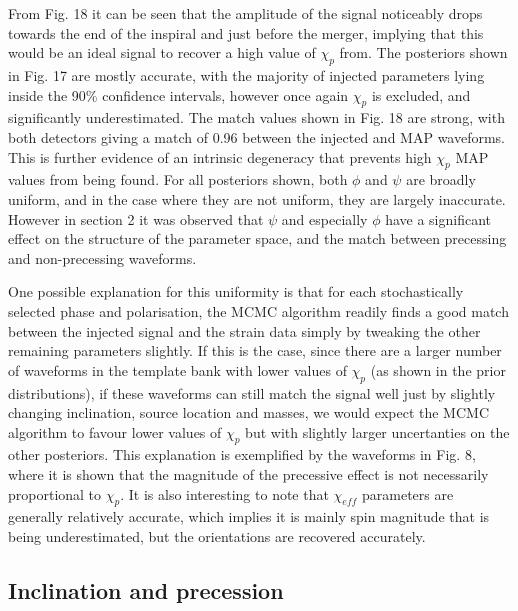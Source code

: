 \documentclass[11pt]{article}
\begin{document}
From Fig. 18 it can be seen that the amplitude of the signal noticeably drops towards the end of the inspiral and just before the merger, implying that this would be an ideal signal to recover a high value of $\chi_p$ from. The posteriors shown in Fig. 17 are mostly accurate, with the majority of injected parameters lying inside the 90\% confidence intervals, however once again $\chi_p$ is excluded, and significantly underestimated. The match values shown in Fig. 18 are strong, with both detectors giving a match of 0.96 between the injected and MAP waveforms. This is further evidence of an intrinsic degeneracy that prevents high $\chi_p$ MAP values from being found. For all posteriors shown, both $\phi$ and $\psi$ are broadly uniform, and in the case where they are not uniform, they are largely inaccurate. However in section 2 it was observed that $\psi$ and especially $\phi$ have a significant effect on the structure of the parameter space, and the match between precessing and non-precessing waveforms.

One possible explanation for this uniformity is that for each stochastically selected phase and polarisation, the MCMC algorithm readily finds a good match between the injected signal and the strain data simply by tweaking the other remaining parameters slightly. If this is the case, since there are a larger number of waveforms in the template bank with lower values of $\chi_p$ (as shown in the prior distributions), if these waveforms can still match the signal well just by slightly changing inclination, source location and masses, we would expect the MCMC algorithm to favour lower values of $\chi_p$ but with slightly larger uncertanties on the other posteriors. This explanation is exemplified by the waveforms in Fig. 8, where it is shown that the magnitude of the precessive effect is not necessarily proportional to $\chi_p$. It is also interesting to note that $\chi_{eff}$ parameters are generally relatively accurate, which implies it is mainly spin magnitude that is being underestimated, but the orientations are recovered accurately.

\subsection{Inclination and precession}
\end{document}
